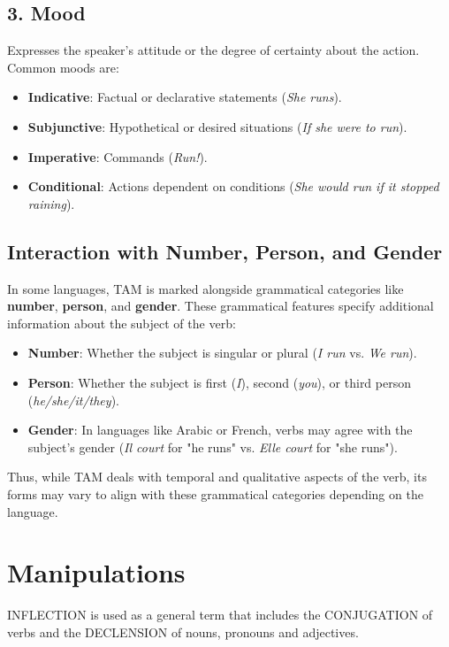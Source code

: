 \documentclass{book}
\begin{document}
\section*{3. Mood}
Expresses the speaker’s attitude or the degree of certainty about the action. Common moods are:
\begin{itemize}
	\item \textbf{Indicative}: Factual or declarative statements (\emph{She runs}).
	\item \textbf{Subjunctive}: Hypothetical or desired situations (\emph{If she were to run}).
	\item \textbf{Imperative}: Commands (\emph{Run!}).
	\item \textbf{Conditional}: Actions dependent on conditions (\emph{She would run if it stopped raining}).
\end{itemize}

\section*{Interaction with Number, Person, and Gender}
In some languages, TAM is marked alongside grammatical categories like \textbf{number}, \textbf{person}, and \textbf{gender}. These grammatical features specify additional information about the subject of the verb:
\begin{itemize}
	\item \textbf{Number}: Whether the subject is singular or plural (\emph{I run} vs. \emph{We run}).
	\item \textbf{Person}: Whether the subject is first (\emph{I}), second (\emph{you}), or third person (\emph{he/she/it/they}).
	\item \textbf{Gender}: In languages like Arabic or French, verbs may agree with the subject’s gender (\emph{Il court} for "he runs" vs. \emph{Elle court} for "she runs").
\end{itemize}

Thus, while TAM deals with temporal and qualitative aspects of the verb, its forms may vary to align with these grammatical categories depending on the language.


\chapter{Manipulations}

INFLECTION is used as a general term that includes the CONJUGATION of verbs and the DECLENSION of nouns, pronouns and adjectives.
\end{document}

